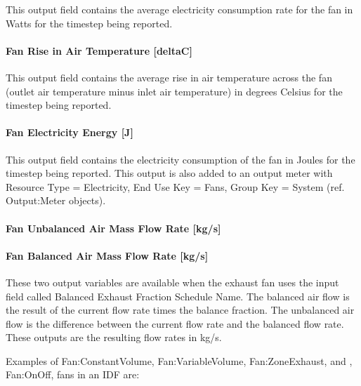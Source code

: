 This output field contains the average electricity consumption rate for the fan in Watts for the timestep being reported.

\paragraph{Fan Rise in Air Temperature {[}deltaC{]}}\label{fan-rise-in-air-temperature-deltac-3}

This output field contains the average rise in air temperature across the fan (outlet air temperature minus inlet air temperature) in degrees Celsius for the timestep being reported.

\paragraph{Fan Electricity Energy {[}J{]}}\label{fan-electric-energy-j-3}

This output field contains the electricity consumption of the fan in Joules for the timestep being reported. This output is also added to an output meter with Resource Type = Electricity, End Use Key = Fans, Group Key = System (ref. Output:Meter objects).

\paragraph{Fan Unbalanced Air Mass Flow Rate {[}kg/s{]}}\label{fan-unbalanced-air-mass-flow-rate-kgs}

\paragraph{Fan Balanced Air Mass Flow Rate {[}kg/s{]}}\label{fan-balanced-air-mass-flow-rate-kgs}

These two output variables are available when the exhaust fan uses the input field called Balanced Exhaust Fraction Schedule Name. The balanced air flow is the result of the current flow rate times the balance fraction. The unbalanced air flow is the difference between the current flow rate and the balanced flow rate. These outputs are the resulting flow rates in kg/s.

Examples of Fan:ConstantVolume, Fan:VariableVolume, Fan:ZoneExhaust, and , Fan:OnOff, fans in an IDF are:

